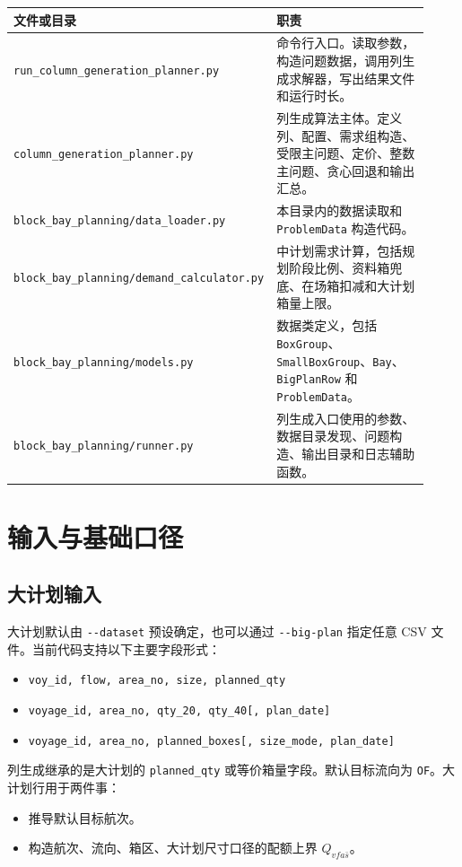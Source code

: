 \documentclass[UTF8,a4paper,11pt]{ctexart}
\newcommand{\code}[1]{\nolinkurl{#1}}
\begin{document}
\begin{longtable}{L{0.34\linewidth}L{0.58\linewidth}}
\toprule
文件或目录 & 职责\\
\midrule
\code{run_column_generation_planner.py} & 命令行入口。读取参数，构造问题数据，调用列生成求解器，写出结果文件和运行时长。\\
\code{column_generation_planner.py} & 列生成算法主体。定义列、配置、需求组构造、受限主问题、定价、整数主问题、贪心回退和输出汇总。\\
\code{block_bay_planning/data_loader.py} & 本目录内的数据读取和 \code{ProblemData} 构造代码。\\
\code{block_bay_planning/demand_calculator.py} & 中计划需求计算，包括规划阶段比例、资料箱兜底、在场箱扣减和大计划箱量上限。\\
\code{block_bay_planning/models.py} & 数据类定义，包括 \code{BoxGroup}、\code{SmallBoxGroup}、\code{Bay}、\code{BigPlanRow} 和 \code{ProblemData}。\\
\code{block_bay_planning/runner.py} & 列生成入口使用的参数、数据目录发现、问题构造、输出目录和日志辅助函数。\\
\bottomrule
\end{longtable}

\section{输入与基础口径}

\subsection{大计划输入}

大计划默认由 \code{--dataset} 预设确定，也可以通过 \code{--big-plan} 指定任意 CSV 文件。当前代码支持以下主要字段形式：
\begin{itemize}
  \item \code{voy_id, flow, area_no, size, planned_qty}
  \item \code{voyage_id, area_no, qty_20, qty_40[, plan_date]}
  \item \code{voyage_id, area_no, planned_boxes[, size_mode, plan_date]}
\end{itemize}

列生成继承的是大计划的 \code{planned_qty} 或等价箱量字段。默认目标流向为 \code{OF}。大计划行用于两件事：
\begin{itemize}
  \item 推导默认目标航次。
  \item 构造航次、流向、箱区、大计划尺寸口径的配额上界 \(Q_{vfa\bar{s}}\)。
\end{itemize}
\end{document}
